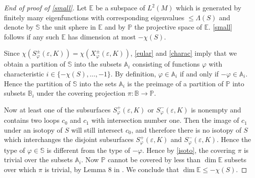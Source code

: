\begin{proof}[End of proof of \cref{small}]
Let $\mathbb E$ be a subspace of $L^2(M)$
which is generated by finitely many eigenfunctions
with corresponding eigenvalues $\le\Lambda(S)$
and denote by $\mathbb S$ the unit sphere in $\mathbb E$
and by $\mathbb P$ the projective space of $\mathbb E$.
\cref{small} follows if any such $\mathbb E$ has dimension at most $-\chi(S)$.

Since $\chi(S_{\varphi}^\pm({\varepsilon},K))=\chi(X_{\varphi}^\pm({\varepsilon},K))$,
\eqref{eular} and \cref{charac} imply that we obtain a partition of $\mathbb S$
into the subsets $\mathbb A_i$ consisting of functions ${\varphi}$
with characteristic $i\in\{-\chi(S),\dots,-1\}$.
By definition, ${\varphi}\in\mathbb A_i$ if and only if $-{\varphi}\in\mathbb A_i$.
Hence the partition of $\mathbb S$ into the sets $\mathbb A_i$
is the preimage of a partition of $\mathbb P$ into subsets $\mathbb B_i$
under the covering projection $\pi\colon\mathbb B\to\mathbb P$.

Now at least one of the subsurfaces $S_{\varphi}^+({\varepsilon},K)$ or $S_{\varphi}^-({\varepsilon},K)$ is nonempty
and contains two loops $c_0$ and $c_1$ with intersection number one.
Then the image of $c_1$ under an isotopy of $S$ will still intersect $c_0$,
and therefore there is no isotopy of $S$ which interchanges the disjoint
subsurfaces $S_{\varphi}^+({\varepsilon},K)$ and $S_{\varphi}^-({\varepsilon},K)$.
Hence the type of ${\varphi}\in\mathbb S$ is different from the type of $-{\varphi}$.
Hence by \cref{isoto}, the covering $\pi$ is trivial over the subsets $\mathbb A_i$.
Now $\mathbb P$ cannot be covered by less than $\dim\mathbb E$ subsets
over which $\pi$ is trivial, by Lemma 8 in \cite{Se}.
We conclude that $\dim\mathbb E\le-\chi(S)$.
\end{proof}

